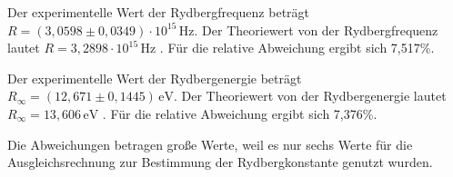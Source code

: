 Der experimentelle Wert der Rydbergfrequenz beträgt \(R =(3,0598 \pm 0,0349) \cdot 10^{15}\,\mathrm{Hz}\).
Der Theoriewert  von der Rydbergfrequenz lautet \(R =3,2898 \cdot 10^{15}\,\mathrm{Hz}\) \cite{RB}.
Für die relative Abweichung ergibt sich 7,517\%. 

Der experimentelle Wert der Rydbergenergie beträgt \(R_{\infty} =(12,671 \pm 0,1445)\,\mathrm{eV}\).
Der Theoriewert  von der Rydbergenergie lautet \(R_{\infty} =13,606\,\mathrm{eV}\) \cite{RB}.
Für die relative Abweichung ergibt sich 7,376\%. 

Die Abweichungen betragen gro{\ss}e Werte, weil es nur sechs Werte für die Ausgleichsrechnung zur Bestimmung der Rydbergkonstante genutzt wurden.
